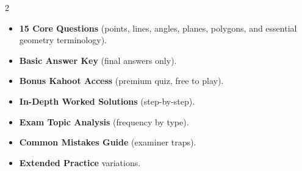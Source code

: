 \documentclass[11pt,a4paper]{article}
\newcommand{\FullReleaseDate}{April 30, 2026}
\begin{document}
\vspace{8pt}

\begin{multicols}{2}
  \begin{tcolorbox}[card, title=\sffamily\bfseries\textcolor{white}{\faHandPointDown\ TODAY (Simplified Version)}, colbacktitle=mainblue, boxed title style={sharp corners, boxrule=0pt}]
    \begin{itemize}[leftmargin=1.2em, itemsep=2pt]
      \item \small \textbf{15 Core Questions} (points, lines, angles, planes, polygons, and essential geometry terminology).
      \item \small \textbf{Basic Answer Key} (final answers only).
      \item \small \textbf{Bonus Kahoot Access} (premium quiz, free to play).
    \end{itemize}
  \end{tcolorbox}

  \columnbreak

  \begin{tcolorbox}[card, title=\sffamily\bfseries\textcolor{white}{\faRocket\ ON \FullReleaseDate\ (Full Upgrade)}, colbacktitle=mainblue, boxed title style={sharp corners, boxrule=0pt}]
    \begin{itemize}[leftmargin=1.2em, itemsep=2pt]
      \item \small \textbf{In-Depth Worked Solutions} (step-by-step).
      \item \small \textbf{Exam Topic Analysis} (frequency by type).
      \item \small \textbf{Common Mistakes Guide} (examiner traps).
      \item \small \textbf{Extended Practice} variations.
    \end{itemize}
  \end{tcolorbox}
\end{multicols}
\end{document}
